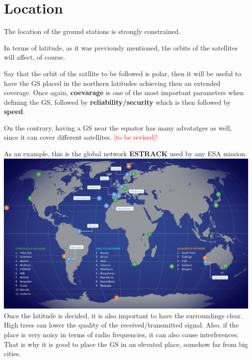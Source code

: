 \documentclass[12pt,a4paper]{article}
\begin{document}
\section{Location}

The location of the ground stations is strongly constrained. 
\newline

In terms of latitude, as it was previously mentioned, the orbits of the satellites will affect, of course.

Say that the orbit of the satllite to be followed is polar, then it will be useful to have the GS placed in the northern latitudes achieving then an extended coverage. Once again, \textbf{coevarage} is one of the most important parameters when defining the GS, followed by \textbf{reliability/security} which is then followed  by \textbf{speed}.

On the contrary, having a GS near the equator has many advatatges as well, since it can cover different satellites. \textcolor{red}{[to be revised]!}

As an example, this is the global network \textbf{ESTRACK} used by any ESA mission.
\newline
\includegraphics[scale=0.6]{./img/Network_map}
\newline
\newline
Once the latitude is decided, it is also important to have the surroundings clear. High trees can lower the quality of the received/transmitted signal. Also, if the place is very noisy in terms of radio frequencies, it can also cause interferences.
That is why it is good to place the GS in an elevated place, somehow far from big cities.
\end{document}
